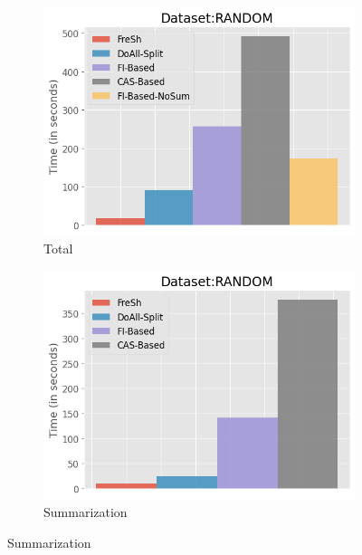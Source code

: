 \begin{figure}[htbp]
    \centering
    \begin{subfigure}{0.48\textwidth}  
        \includegraphics[width=\textwidth]{figures/Experiments/baselines-random-total.png}
        \caption{Total}
        \label{fig:eval:baselines:random:100GB:total}
    \end{subfigure}    
    \begin{subfigure}{0.48\textwidth}  
        \includegraphics[width=\textwidth]{figures/Experiments/baselines-random-summarization.png}
        \caption{Summarization}
        \label{fig:eval:baselines:random:100GB:summarization}
    \end{subfigure}    


\end{figure}
